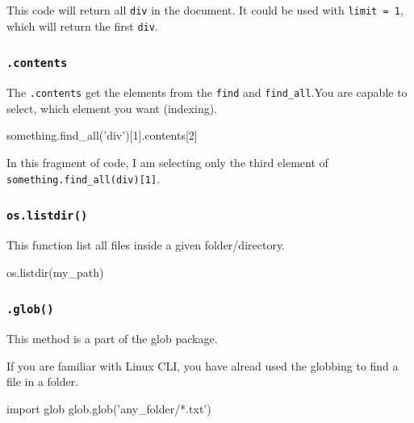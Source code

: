 \documentclass[]{book}
\newenvironment{Shaded}{\begin{snugshade}}{\end{snugshade}}
\newcommand{\DecValTok}[1]{\textcolor[rgb]{0.00,0.00,0.81}{#1}}
\newcommand{\StringTok}[1]{\textcolor[rgb]{0.31,0.60,0.02}{#1}}
\newcommand{\ImportTok}[1]{#1}
\newcommand{\NormalTok}[1]{#1}
\begin{document}
This code will return all \texttt{div} in the document. It could be used
with \texttt{limit\ =\ 1}, which will return the first \texttt{div}.

\subsubsection{\texorpdfstring{\texttt{.contents}}{.contents}}\label{contents}

The \texttt{.contents} get the elements from the \texttt{find} and
\texttt{find\_all}.You are capable to select, which element you want
(indexing).

\begin{Shaded}
\begin{Highlighting}[]
\NormalTok{something.find_all(}\StringTok{'div'}\NormalTok{)[}\DecValTok{1}\NormalTok{].contents[}\DecValTok{2}\NormalTok{]}
\end{Highlighting}
\end{Shaded}

In this fragment of code, I am selecting only the third element of
\texttt{something.find\_all(\textquotesingle{}div\textquotesingle{}){[}1{]}}.

\subsubsection{\texorpdfstring{\texttt{os.listdir()}}{os.listdir()}}\label{os.listdir}

This function list all files inside a given folder/directory.

\begin{Shaded}
\begin{Highlighting}[]
\NormalTok{os.listdir(my_path)}
\end{Highlighting}
\end{Shaded}

\subsubsection{\texorpdfstring{\texttt{.glob()}}{.glob()}}\label{glob}

This method is a part of the glob package.

If you are familiar with Linux CLI, you have alread used the globbing to
find a file in a folder.

\begin{Shaded}
\begin{Highlighting}[]
\ImportTok{import}\NormalTok{ glob}
\NormalTok{glob.glob(}\StringTok{'any_folder/*.txt'}\NormalTok{)}
\end{Highlighting}
\end{Shaded}
\end{document}
